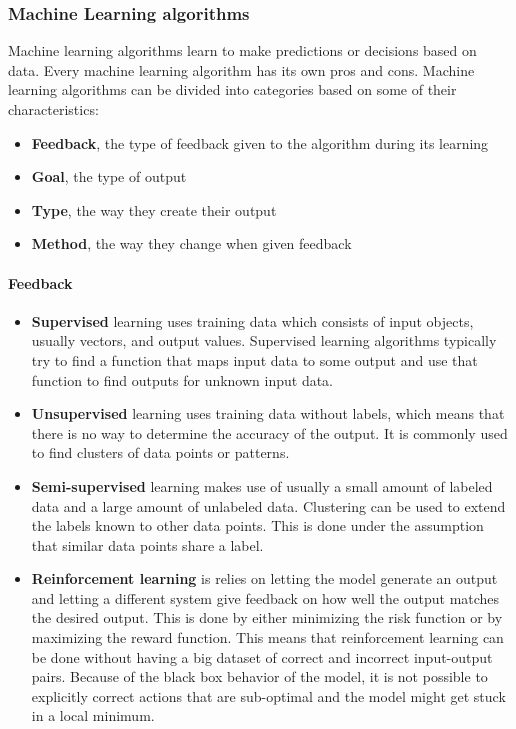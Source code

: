 \subsubsection{Machine Learning algorithms}
Machine learning algorithms learn to make predictions or decisions based on data. Every machine learning algorithm has its own pros and cons. Machine learning algorithms can be divided into categories based on some of their characteristics:
\begin{itemize}
	\item \textbf{Feedback}, the type of feedback given to the algorithm during its learning
	\item \textbf{Goal}, the type of output
	\item \textbf{Type}, the way they create their output
	\item \textbf{Method}, the way they change when given feedback
\end{itemize}

\paragraph{Feedback}
\begin{itemize}
	\item \textbf{Supervised}
		learning uses training data which consists of input objects, usually vectors, and output values. Supervised learning algorithms typically try to find a function that maps input data to some output and use that function to find outputs for unknown input data.
	\item \textbf{Unsupervised}
		learning uses training data without labels, which means that there is no way to determine the accuracy of the output. It is commonly used to find clusters of data points or patterns.
	\item \textbf{Semi-supervised}
		learning makes use of usually a small amount of labeled data and a large amount of unlabeled data. Clustering can be used to extend the labels known to other data points. This is done under the assumption that similar data points share a label.
	\item \textbf{Reinforcement learning}
		is relies on letting the model generate an output and letting a different system give feedback on how well the output matches the desired output. This is done by either minimizing the risk function or by maximizing the reward function. This means that reinforcement learning can be done without having a big dataset of correct and incorrect input-output pairs. Because of the black box behavior of the model, it is not possible to explicitly correct actions that are sub-optimal and the model might get stuck in a local minimum.
\end{itemize}

